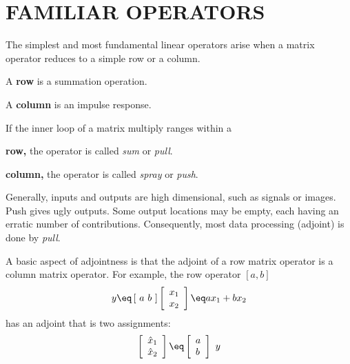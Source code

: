 \section{FAMILIAR OPERATORS}
The simplest and most fundamental linear operators
arise when a matrix operator reduces to a simple row or a column.
\par\noindent
A {\bf row} is a summation operation.
\par\noindent
A {\bf column}       is an impulse response.
\vspace{.2in}
\par\noindent
If the inner loop of a matrix multiply ranges within a
\par\noindent
{\bf row,} the operator is called {\em  sum} or {\em  pull}.
\par\noindent
{\bf column,}       the operator is called {\em  spray} or {\em  push}.
\par\noindent
Generally, inputs and outputs are high dimensional, such as signals or images.
Push gives ugly outputs.   Some output locations may be empty,
each having an erratic number of contributions.
Consequently, most data processing (adjoint) is done by {\em pull}.

\par
A basic aspect of adjointness is that the
adjoint of a row matrix operator is a column matrix operator.
For example,
the row operator $[a,b]$
\begin{equation}
y \eq
\left[ \ a \ b \ \right] 
\left[
\begin{array}{l}
        x_1 \\
        x_2
\end{array}
\right] 
\eq
a x_1 + b x_2
\end{equation}
has an adjoint that is two assignments:
\begin{equation}
        \left[
        \begin{array}{l}
                \hat x_1 \\
                \hat x_2
        \end{array}
        \right]
        \eq
        \left[
        \begin{array}{l}
                a \\
                b
        \end{array}
        \right]
        \ y
\end{equation}
\par
{}

